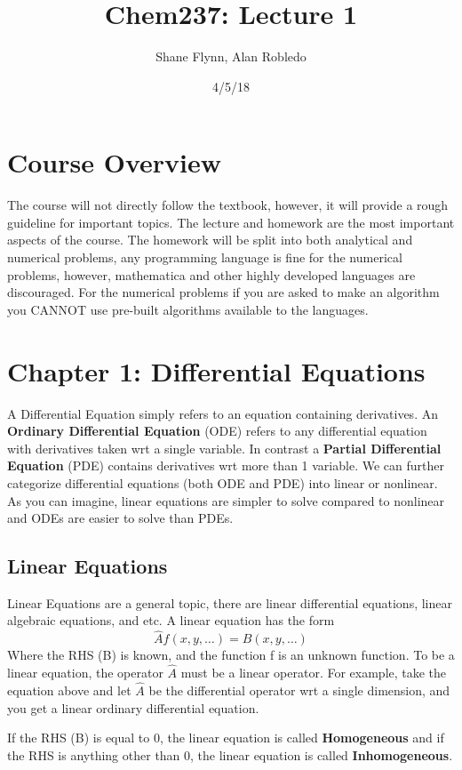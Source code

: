 \documentclass{article}
\title{Chem237: Lecture 1}
\date{4/5/18}
\author{Shane Flynn, Alan Robledo}
\newcommand{\be}{\begin{equation}}
\newcommand{\ee}{\end{equation}}
\begin{document}
\maketitle
\section*{Course Overview}
The course will not directly follow the textbook, however, it will provide a rough guideline for important topics.
The lecture and homework are the most important aspects of the course.
The homework will be split into both analytical and numerical problems, any programming language is fine for the numerical problems, however, mathematica and other highly developed languages are discouraged.
For the numerical problems if you are asked to make an algorithm you CANNOT use pre-built algorithms available to the languages.

\section*{Chapter 1: Differential Equations}
A Differential Equation simply refers to an equation containing derivatives.
An \textbf{Ordinary Differential Equation} (ODE) refers to any differential equation with derivatives taken wrt a single variable.
In contrast a \textbf{Partial Differential Equation} (PDE) contains derivatives wrt more than 1 variable.
We can further categorize differential equations (both ODE and PDE) into linear or nonlinear.
As you can imagine, linear equations are simpler to solve compared to nonlinear and ODEs are easier to solve than PDEs.

\subsection*{Linear Equations}
Linear Equations are a general topic, there are linear differential equations, linear algebraic equations, and etc.
A linear equation has the form
\be
\hat{A} f(x,y,\hdots) = B(x,y,\hdots)
\ee
Where the RHS (B) is known, and the function f is an unknown function.
To be a linear equation, the operator $\hat{A}$ must be a linear operator.
For example, take the equation above and let $\hat{A}$ be the differential operator wrt a single dimension, and you get a linear ordinary differential equation.

If the RHS (B) is equal to 0, the linear equation is called \textbf{Homogeneous} and if the RHS is anything other than 0, the linear equation is called \textbf{Inhomogeneous}.
\end{document}
